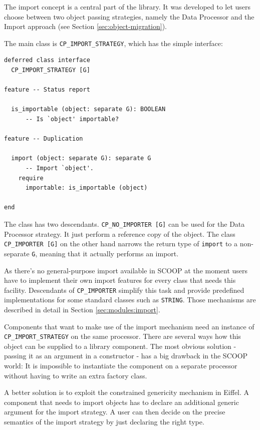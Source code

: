 The import concept is a central part of the library.
It was developed to let users choose between two object passing strategies, namely the Data Processor and the Import approach (see Section \ref{sec:object-migration}).

The main class is \lstinline!CP_IMPORT_STRATEGY!, which has the simple interface:

\begin{lstlisting}[language=OOSC2Eiffel, captionpos=b, caption={The deferred class CP\_IMPORT\_STRATEGY.}]
deferred class interface
  CP_IMPORT_STRATEGY [G]

feature -- Status report

  is_importable (object: separate G): BOOLEAN
      -- Is `object' importable?

feature -- Duplication

  import (object: separate G): separate G
      -- Import `object'.
    require
      importable: is_importable (object)

end
\end{lstlisting}


The class has two descendants.
\lstinline!CP_NO_IMPORTER [G]! can be used for the Data Processor strategy. 
It just perform a reference copy of the object.
The class \lstinline!CP_IMPORTER [G]! on the other hand narrows the return type of \lstinline!import! to a non-separate \lstinline!G!, meaning that it actually performs an import.

As there's no general-purpose import available in SCOOP at the moment users have to implement their own import features for every class that needs this facility.
Descendants of \lstinline!CP_IMPORTER! simplify this task and provide predefined implementations for some standard classes such as \lstinline!STRING!.
Those mechanisms are described in detail in Section \ref{sec:modules:import}.

Components that want to make use of the import mechanism need an instance of \lstinline!CP_IMPORT_STRATEGY! on the same processor.
There are several ways how this object can be supplied to a library component.
The most obvious solution - passing it as an argument in a constructor - has a big drawback in the SCOOP world:
It is impossible to instantiate the component on a separate processor without having to write an extra factory class.

A better solution is to exploit the constrained genericity mechanism in Eiffel.
A component that needs to import objects has to declare an additional generic argument for the import strategy.
A user can then decide on the precise semantics of the import strategy by just declaring the right type.


